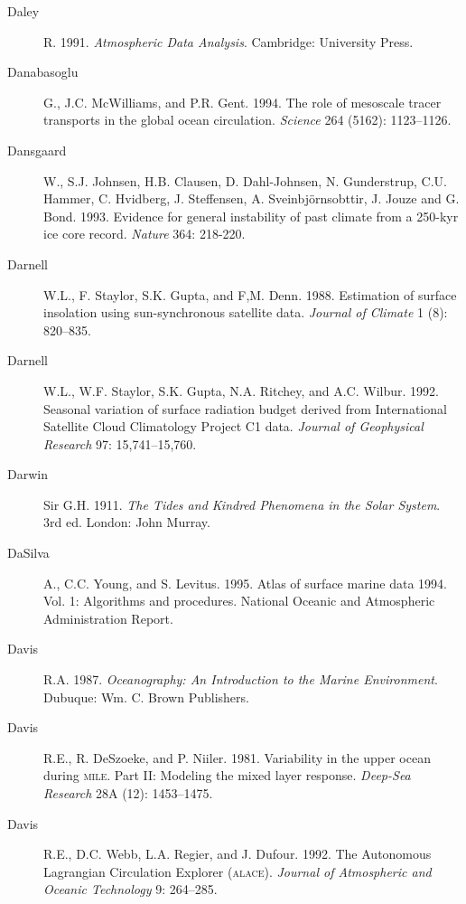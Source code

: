 \begin{description}
\item [Daley]R. 1991. \textit{Atmospheric Data Analysis}.  Cambridge:
  University Press.

\item [Danabasoglu]G., J.C. McWilliams, and P.R. Gent. 1994. The role
  of mesoscale tracer transports in the global ocean
  circulation. \textit{Science} 264 (5162): 1123--1126.

\item [Dansgaard]W., S.J. Johnsen, H.B. Clausen, D. Dahl-Johnsen, N.
  Gunderstrup, C.U. Hammer, C. Hvidberg, J. Steffensen,
  A. Sveinbjörnsobttir, J.  Jouze and G. Bond. 1993. Evidence for
  general instability of past climate from a 250-kyr ice core
  record. \textit{Nature} 364: 218-220.

\item [Darnell]W.L., F. Staylor, S.K. Gupta, and
  F,M. Denn. 1988. Estimation of surface insolation using
  sun-synchronous satellite data. \textit{Journal of Climate} 1 (8):
  820--835.

\item [Darnell]W.L., W.F. Staylor, S.K. Gupta, N.A. Ritchey, and
  A.C. Wilbur.  1992. Seasonal variation of surface radiation budget
  derived from International Satellite Cloud Climatology Project C1
  data. \textit{Journal of Geophysical Research} 97: 15,741--15,760.

\item [Darwin]Sir G.H. 1911. \textit{The Tides and Kindred Phenomena
  in the Solar System}. 3rd ed.  London: John Murray.

\item [DaSilva]A., C.C. Young, and S. Levitus. 1995. Atlas of surface
  marine data 1994. Vol. 1: Algorithms and procedures. National
  Oceanic and Atmospheric Administration Report.

\item [Davis]R.A. 1987. \textit{Oceanography: An Introduction to the
  Marine Environment}. Dubuque: Wm. C. Brown Publishers.

\item [Davis]R.E., R. DeSzoeke, and P. Niiler. 1981. Variability in
  the upper ocean during \textsc{mile}. Part II: Modeling the mixed
  layer response. \textit{Deep-Sea Research} 28A (12): 1453--1475.

\item [Davis]R.E., D.C. Webb, L.A. Regier, and J. Dufour. 1992. The
  Autonomous Lagrangian Circulation Explorer
  (\textsc{alace}). \textit{Journal of Atmospheric and Oceanic
    Technology} 9: 264--285.


\end{description}
